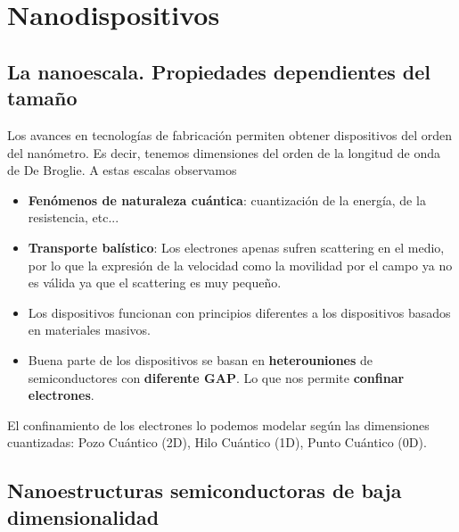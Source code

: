 \pagestyle{fancy}

\chapter{Nanodispositivos}
\section{La nanoescala. Propiedades dependientes del tamaño}
Los avances en tecnologías de fabricación permiten obtener dispositivos del orden del nanómetro. Es decir, tenemos dimensiones del orden de la longitud de onda de De Broglie. A estas escalas observamos
\begin{itemize}
    \item \textbf{Fenómenos de naturaleza cuántica}: cuantización de la energía, de la resistencia, etc...
    \item \textbf{Transporte balístico}: Los electrones apenas sufren scattering en el medio, por lo que la expresión de la velocidad como la movilidad por el campo ya no es válida ya que el scattering es muy pequeño.
    \item  Los dispositivos funcionan con principios diferentes a los dispositivos basados en materiales masivos.
    \item Buena parte de los dispositivos se basan en \textbf{heterouniones} de semiconductores con \textbf{diferente GAP}. Lo que nos permite \textbf{confinar electrones}.
\end{itemize}
El confinamiento de los electrones lo podemos modelar según las dimensiones cuantizadas: Pozo Cuántico (2D), Hilo Cuántico (1D), Punto Cuántico (0D).
\section{Nanoestructuras semiconductoras de baja dimensionalidad}
